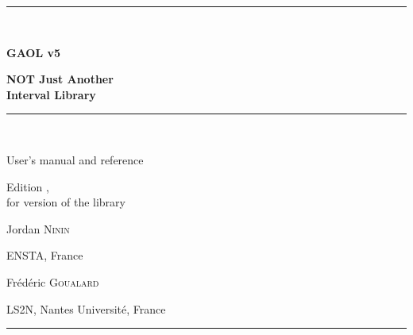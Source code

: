 \begin{titlepage}
\thispagestyle{vide}
\null\vspace{1cm}
\begin{center}
\rule{\textwidth}{1pt}\\[1.4cm]
{\fontsize{40pt}{44pt}\selectfont\bfseries GAOL v5\par}
\vspace{0.8cm}
{\LARGE\bfseries NOT Just Another\\[0.2cm] Interval Library\par}
\vspace{1.4cm}
\rule{\textwidth}{1pt}\\[1.6cm]
{\Large User's manual and reference\par}
\vspace{0.6cm}
{\large Edition \edition, \updated\\[0.2cm]
for version \version{} of the library\par}
\vfill
{\Large Jordan \textsc{Ninin}\par}
\vspace{0.2cm}
{\large ENSTA, France\par}
\vspace{0.9cm}
{\Large Fr\'ed\'eric \textsc{Goualard}\par}
\vspace{0.2cm}
{\large LS2N, Nantes Universit\'e, France\par}
\vspace{1.4cm}
\rule{\textwidth}{1pt}
\end{center}
\end{titlepage}
